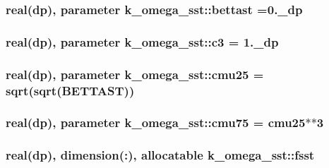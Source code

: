 \hypertarget{classk__omega__sst_aec0edc6222990ba2e0f8be950b183646}{
\subsubsection[{bettast}]{\setlength{\rightskip}{0pt plus 5cm}real(dp), parameter k\-\_\-omega\-\_\-sst\-::bettast =0.\-\_\-dp}}\label{classk__omega__sst_aec0edc6222990ba2e0f8be950b183646}
\hypertarget{classk__omega__sst_a4de6fc64d23bbb9405db42e2bc688365}{
\subsubsection[{c3}]{\setlength{\rightskip}{0pt plus 5cm}real(dp), parameter k\-\_\-omega\-\_\-sst\-::c3 = 1.\-\_\-dp}}\label{classk__omega__sst_a4de6fc64d23bbb9405db42e2bc688365}
\hypertarget{classk__omega__sst_a2fcd6b5d353eca169d1ed26030035527}{
\subsubsection[{cmu25}]{\setlength{\rightskip}{0pt plus 5cm}real(dp), parameter k\-\_\-omega\-\_\-sst\-::cmu25 = sqrt(sqrt(B\-E\-T\-T\-A\-S\-T))}}\label{classk__omega__sst_a2fcd6b5d353eca169d1ed26030035527}
\hypertarget{classk__omega__sst_aac6d679de77188184e955ebdb8b4f56e}{
\subsubsection[{cmu75}]{\setlength{\rightskip}{0pt plus 5cm}real(dp), parameter k\-\_\-omega\-\_\-sst\-::cmu75 = {\bf cmu25}$\ast$$\ast$3}}\label{classk__omega__sst_aac6d679de77188184e955ebdb8b4f56e}
\hypertarget{classk__omega__sst_a6e5e5e6fe57f54e43223912b88f269d7}{
\subsubsection[{fsst}]{\setlength{\rightskip}{0pt plus 5cm}real(dp), dimension(\-:), allocatable k\-\_\-omega\-\_\-sst\-::fsst}}\label{classk__omega__sst_a6e5e5e6fe57f54e43223912b88f269d7}

